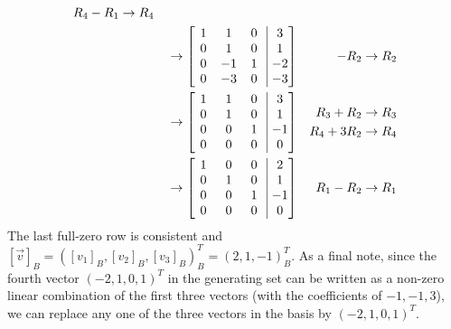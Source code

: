 \begin{solution}
\begin{align*}
\begin{aligned}
R_4 - R_1 &\to R_4
\end{aligned} \\
&\to
\left[\begin{array}{@{\,}wc{10pt}wc{10pt}wc{10pt}|wc{10pt}@{\,}}
1 & 1 & 0 & 3 \\
0 & 1 & 0 & 1\\
0 & -1 & 1 & -2\\
0 & -3 & 0 & -3 
\end{array}\right]
& -R_2 \to R_2 \\
&\to
\left[\begin{array}{@{\,}wc{10pt}wc{10pt}wc{10pt}|wc{10pt}@{\,}}
1 & 1 & 0 & 3 \\
0 & 1 & 0 & 1\\
0 & 0 & 1 & -1\\
0 & 0 & 0 & 0 
\end{array}\right]
& 
\begin{aligned}
R_3 + R_2 &\to R_3 \\
R_4 + 3R_2 &\to R_4
\end{aligned} \\
&\to
\left[\begin{array}{@{\,}wc{10pt}wc{10pt}wc{10pt}|wc{10pt}@{\,}}
1 & 0 & 0 & 2 \\
0 & 1 & 0 & 1\\
0 & 0 & 1 & -1\\
0 & 0 & 0 & 0 
\end{array}\right] 
& R_1 - R_2 \to R_1
\end{align*}
The last full-zero row is consistent and $[\vec{v}]_B = ([v_1]_B, [v_2]_B, [v_3]_B)_B^T = (2,1,-1)_B^T$. As a final note, since the fourth vector $(-2,1,0,1)^T$ in the generating set can be written as a non-zero linear combination of the first three vectors (with the coefficients of $-1,-1,3$), we can replace any one of the three vectors in the basis by $(-2,1,0,1)^T$.
\end{solution}

